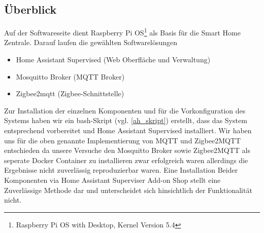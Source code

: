 \subsection{Überblick}\label{sw_ueberblick}
Auf der Softwareseite dient Raspberry Pi OS\footnote{Raspberry Pi OS with Desktop, Kernel Version 5.4} als Basis für die Smart Home Zentrale.
Darauf laufen die gewählten Softwarelösungen
\begin{itemize}
\item Home Assistant Supervised (Web Oberfläche und Verwaltung)
\item Mosquitto Broker (MQTT Broker)
\item Zigbee2mqtt (Zigbee-Schnittstelle)
\end{itemize}
\noindent Zur Installation der einzelnen Komponenten und für die Vorkonfiguration des Systems haben wir ein bash-Skript (vgl. \ref{ah_skript}) erstellt, dass das System entsprechend vorbereitet und Home Assistant Supervised installiert.
Wir haben uns für die oben genannte Implementierung von MQTT und Zigbee2MQTT entschieden da unsere Versuche den Mosquitto Broker sowie Zigbee2MQTT als seperate Docker Container zu installieren zwar erfolgreich waren allerdings die Ergebnisse nicht zuverlässig reproduzierbar waren. Eine Installation Beider Komponenten via Home Assistant Superviser Add-on Shop stellt eine Zuverlässige Methode dar und unterscheidet sich hinsichtlich der Funktionalität nicht.